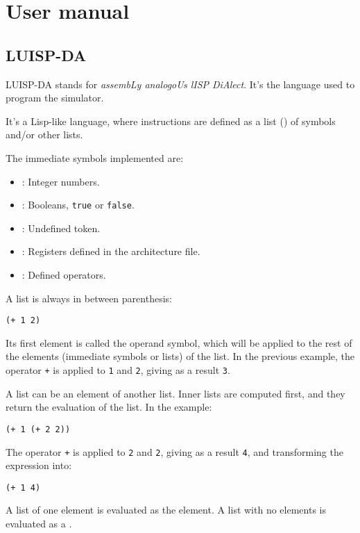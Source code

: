 \chapter{User manual}\label{app:manual}


\section*{LUISP-DA}
LUISP-DA stands for \textit{assembLy analogoUs lISP DiAlect}. It's the language used to program the simulator.

It's a Lisp-like language, where instructions are defined as a list () of symbols and/or other lists.

The immediate symbols implemented are:
\begin{itemize}
  \item {}: Integer numbers.
  \item {}: Booleans, \texttt{true} or \texttt{false}.
  \item {}: Undefined token.
  \item {}: Registers defined in the architecture file.
  \item {}: Defined operators.
\end{itemize}

A list is always in between parenthesis:
\begin{lstlisting}
(+ 1 2)
\end{lstlisting}

Its first element is called the operand symbol, which will be applied to the rest of the elements (immediate symbols or lists) of the list. In the previous example, the operator \texttt{+} is applied to \texttt{1} and \texttt{2}, giving as a result \texttt{3}.

A list can be an element of another list. Inner lists are computed first, and they return the evaluation of the list. In the example:
\begin{lstlisting}
(+ 1 (+ 2 2))
\end{lstlisting}
The operator \texttt{+} is applied to \texttt{2} and \texttt{2}, giving as a result \texttt{4}, and transforming the expression into:
\begin{lstlisting}
(+ 1 4)
\end{lstlisting}

A list of one element is evaluated as the element. A list with no elements is evaluated as a .


